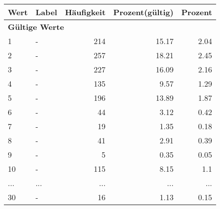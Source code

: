      \begin{longtable}{lXrrr}
     \toprule
     \textbf{Wert} & \textbf{Label} & \textbf{Häufigkeit} & \textbf{Prozent(gültig)} & \textbf{Prozent} \\
     \endhead
     \midrule
     \multicolumn{5}{l}{\textbf{Gültige Werte}}\\
        1 & \multicolumn{1}{X}{-} & %
          \num{214} &
          \num[round-mode=places,round-precision=2]{15.17} &
          \num[round-mode=places,round-precision=2]{2.04} \\
        2 & \multicolumn{1}{X}{-} & %
          \num{257} &
          \num[round-mode=places,round-precision=2]{18.21} &
          \num[round-mode=places,round-precision=2]{2.45} \\
        3 & \multicolumn{1}{X}{-} & %
          \num{227} &
          \num[round-mode=places,round-precision=2]{16.09} &
          \num[round-mode=places,round-precision=2]{2.16} \\
        4 & \multicolumn{1}{X}{-} & %
          \num{135} &
          \num[round-mode=places,round-precision=2]{9.57} &
          \num[round-mode=places,round-precision=2]{1.29} \\
        5 & \multicolumn{1}{X}{-} & %
          \num{196} &
          \num[round-mode=places,round-precision=2]{13.89} &
          \num[round-mode=places,round-precision=2]{1.87} \\
        6 & \multicolumn{1}{X}{-} & %
          \num{44} &
          \num[round-mode=places,round-precision=2]{3.12} &
          \num[round-mode=places,round-precision=2]{0.42} \\
        7 & \multicolumn{1}{X}{-} & %
          \num{19} &
          \num[round-mode=places,round-precision=2]{1.35} &
          \num[round-mode=places,round-precision=2]{0.18} \\
        8 & \multicolumn{1}{X}{-} & %
          \num{41} &
          \num[round-mode=places,round-precision=2]{2.91} &
          \num[round-mode=places,round-precision=2]{0.39} \\
        9 & \multicolumn{1}{X}{-} & %
          \num{5} &
          \num[round-mode=places,round-precision=2]{0.35} &
          \num[round-mode=places,round-precision=2]{0.05} \\
        10 & \multicolumn{1}{X}{-} & %
          \num{115} &
          \num[round-mode=places,round-precision=2]{8.15} &
          \num[round-mode=places,round-precision=2]{1.1} \\
       ... & ... & ... & ... & ... \\
        30 & \multicolumn{1}{X}{-} & %
          \num{16} &
          \num[round-mode=places,round-precision=2]{1.13} &
          \num[round-mode=places,round-precision=2]{0.15} \\


\end{longtable}

